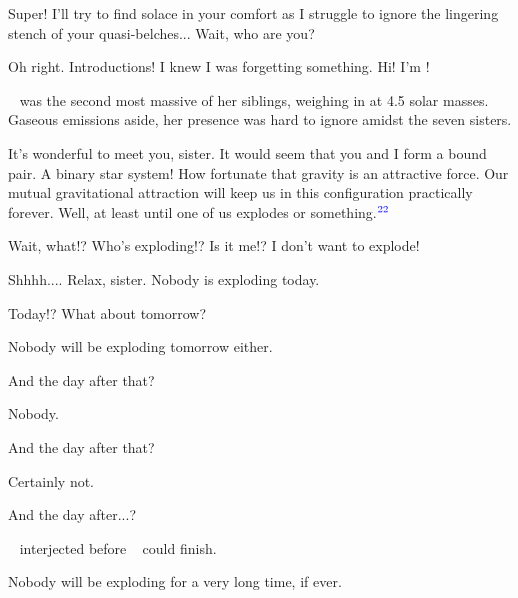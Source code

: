 \documentclass[main.tex]{subfiles}
\begin{document}
\par \Sterope Super!  I'll try to find solace in your comfort as I struggle to ignore the lingering stench of your quasi-belches...  Wait, who are you?

\par \Merope Oh right.  Introductions! I knew I was forgetting something.   Hi!  I'm \rmmerope!

\par \nar \rmmerope~ was the second most massive of her siblings, weighing in at 4.5 solar masses.  Gaseous emissions aside, her presence was hard to ignore amidst the seven sisters.  

\par \Maia It's wonderful to meet you, sister.  It would seem that you and I form a bound pair.  A binary star system!  How fortunate that gravity is an attractive force.  Our mutual gravitational attraction will keep us in this configuration practically forever.  Well, at least until one of us explodes or something.$^{\textcolor{blue}{22}}$

\par \Merope Wait, what!?  Who's exploding!?  Is it me!?  I don't want to explode!

\par \Maia Shhhh....  Relax, sister.  Nobody is exploding today.  

\par \Merope Today!?  What about tomorrow?  

\par \Maia Nobody will be exploding tomorrow either.

\par \Merope And the day after that?

\par \Maia Nobody.

\par \Merope And the day after that?

\par \Maia Certainly not.

\par \Merope And the day after...?

\par \nar \rmmaia~ interjected before \rmmerope~ could finish.

\par \Maia Nobody will be exploding for a very long time, if ever.
\end{document}

